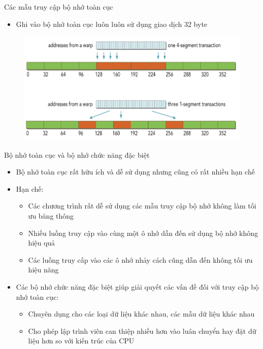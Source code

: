 \documentclass[10pt]{beamer}
\theoremstyle{remark}
\numberwithin{algocf}{section}
\numberwithin{equation}{section}
\numberwithin{dl}{section}
\numberwithin{figure}{section}
\begin{document}
\begin{frame}{Các mẫu truy cập bộ nhớ toàn cục}
    \begin{itemize}
        \item Ghi vào bộ nhớ toàn cục luôn luôn sử dụng giao dịch 32 byte
    \end{itemize}
    \begin{figure}[H]
        \centering
        \includegraphics[width=0.7\linewidth]{figures/CUDA/Global_Memory_Write.png}
    \end{figure}
\end{frame}

\begin{frame}[shrink]{Bộ nhớ toàn cục và bộ nhớ chức năng đặc biệt}
    \begin{itemize}
        \item Bộ nhớ toàn cục rất hữu ích và dễ sử dụng nhưng cũng có rất nhiều hạn chế
        \item Hạn chế:
        \begin{itemize}
            \item Các chương trình rất dễ sử dụng các mẫu truy cập bộ nhớ không làm tối ưu băng thông
            \item Nhiều luồng truy cập vào cùng một ô nhớ dẫn đến sử dụng bộ nhớ không hiệu quả
            \item Các luồng truy cấp vào các ô nhớ nhảy cách cũng dẫn đến không tối ưu hiệu năng
        \end{itemize}
        \item Các bộ nhớ chức năng đặc biệt giúp giải quyết các vấn đề đối với truy cập bộ nhớ toàn cục:
        \begin{itemize}
            \item Chuyên dụng cho các loại dữ liệu khác nhau, các mẫu dữ liệu khác nhau
            \item Cho phép lập trình viên can thiệp nhiều hơn vào luân chuyển hay đặt dữ liệu hơn so với kiến trúc của CPU
        \end{itemize}
    \end{itemize}
\end{frame}
\end{document}
